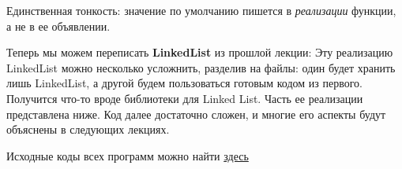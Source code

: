 \begin{lecture}[\lectureSubject]
\begin{lecSection}
		Единственная тонкость: значение по умолчанию пишется в \textit{реализации} функции, а не в ее объявлении.
	\end{lecSection}
	\begin{lecSection}
		Теперь мы можем переписать \textbf{LinkedList} из прошлой лекции:
		Эту реализацию LinkedList можно несколько усложнить, разделив на файлы: один будет хранить лишь LinkedList, а другой будем пользоваться готовым кодом из первого. Получится что-то вроде библиотеки для Linked List. Часть ее реализации представлена ниже. Код далее достаточно сложен, и многие его аспекты будут объяснены в следующих лекциях.
		\begin{center}
			{Исходные коды всех программ можно найти \href{https://github.com/alekseik1/cpp\_lections\_2017/tree/master/lection\%206}{здесь}}
		\end{center}
	\end{lecSection}
\end{lecture}

\renewcommand{\mainFolder}{/home/aleksei/github_projects/latex_works/informatics}
\renewcommand{\myFolder}{\mainFolder/lecture_\arabic{lectureNo}/}

\renewcommand{\lectureSubject}{Контейнеры в C++}
%



